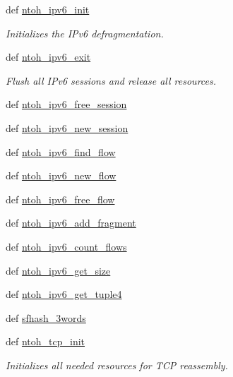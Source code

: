 \begin{DoxyCompactItemize}
\item 
def \hyperlink{namespacelibntoh_a808b2d917189ed6635c33be8db53369e}{ntoh\-\_\-ipv6\-\_\-init}
\begin{DoxyCompactList}\small\item\em Initializes the I\-Pv6 defragmentation. \end{DoxyCompactList}\item 
def \hyperlink{namespacelibntoh_a97fd0b045bb722630083c7f33be1692c}{ntoh\-\_\-ipv6\-\_\-exit}
\begin{DoxyCompactList}\small\item\em Flush all I\-Pv6 sessions and release all resources. \end{DoxyCompactList}\item 
def \hyperlink{namespacelibntoh_ae78241e2e3b8862c2f40db63b17e8982}{ntoh\-\_\-ipv6\-\_\-free\-\_\-session}
\item 
def \hyperlink{namespacelibntoh_a68c9889ffb2bf2240ca3ae27a75789b4}{ntoh\-\_\-ipv6\-\_\-new\-\_\-session}
\item 
def \hyperlink{namespacelibntoh_a19c219b9e6fc394a6fe3a2f195e5510e}{ntoh\-\_\-ipv6\-\_\-find\-\_\-flow}
\item 
def \hyperlink{namespacelibntoh_a1e72977ec4478820d6d18da1a4143455}{ntoh\-\_\-ipv6\-\_\-new\-\_\-flow}
\item 
def \hyperlink{namespacelibntoh_aba58e6cfb09e216baf71533f5d39b9f1}{ntoh\-\_\-ipv6\-\_\-free\-\_\-flow}
\item 
def \hyperlink{namespacelibntoh_a0eed2a936073a47a22f45b52a0a9919a}{ntoh\-\_\-ipv6\-\_\-add\-\_\-fragment}
\item 
def \hyperlink{namespacelibntoh_a286fe15393f1999d64fb2dd0a5a8e7b3}{ntoh\-\_\-ipv6\-\_\-count\-\_\-flows}
\item 
def \hyperlink{namespacelibntoh_ab1c0121c082a2f0ba29aed397447645a}{ntoh\-\_\-ipv6\-\_\-get\-\_\-size}
\item 
def \hyperlink{namespacelibntoh_a3213f1c82559f01940932603f2432f6b}{ntoh\-\_\-ipv6\-\_\-get\-\_\-tuple4}
\item 
def \hyperlink{namespacelibntoh_a64cebc095c211e7679d6fe8b466a3c94}{sfhash\-\_\-3words}
\item 
def \hyperlink{namespacelibntoh_a0ac2c174ee2faef679c1d5fc56a5a439}{ntoh\-\_\-tcp\-\_\-init}
\begin{DoxyCompactList}\small\item\em Initializes all needed resources for T\-C\-P reassembly. \end{DoxyCompactList}\item 

\end{DoxyCompactItemize}
